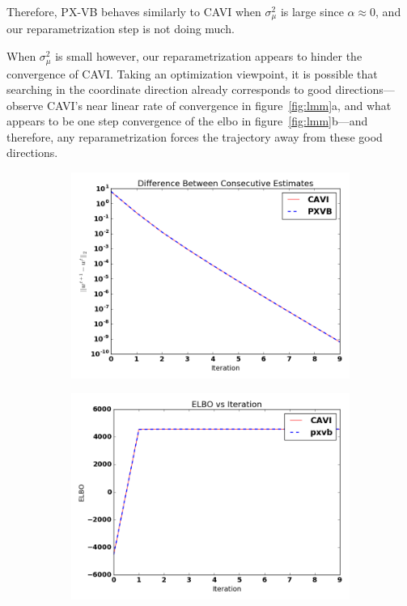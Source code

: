 \documentclass{article}
\begin{document}
Therefore, PX-VB behaves similarly to CAVI when $\sigma_\mu^2$ is large since $\alpha \approx 0$, and our reparametrization step is not doing much. 

When $\sigma_\mu^2$ is small however, our reparametrization appears to hinder the convergence of CAVI. Taking an optimization viewpoint, it is possible that searching in the coordinate direction already corresponds to good directions---observe CAVI's near linear rate of convergence in figure~\ref{fig:lmm}a, and what appears to be one step convergence of the elbo in figure~\ref{fig:lmm}b---and therefore, any reparametrization forces the trajectory away from these good directions. 



\begin{figure}[tb]
    \begin{subfigure}[t]{0.49\textwidth}
        \includegraphics[width=\textwidth]{LMM/pw_lmm_bigvar.png}
        \subcaption{}
    \end{subfigure}
          \begin{subfigure}[t]{0.49\textwidth}
        \includegraphics[width=\textwidth]{LMM/elbo_lmm_bigvar.png}

\end{subfigure}
\end{figure}
\end{document}
